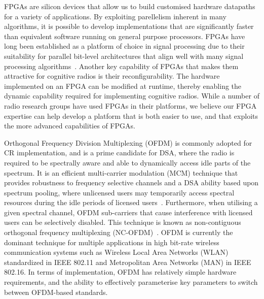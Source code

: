 FPGAs are silicon devices that allow us to build customised hardware datapaths for a variety of applications.
By exploiting parellelism inherent in many algorithms, it is possible to develop implementations that are significantly faster than equivalent software running on general purpose processors.
FPGAs have long been established as a platform of choice in signal processing due to their suitability for parallel bit-level architectures that align well with many signal processing algorithms~\cite{cummings1999}.
Another key capability of FPGAs that makes them attractive for cognitive radios is their reconfigurability.
The hardware implemented on an FPGA can be modified at runtime, thereby enabling the dynamic capability required for implementing cognitive radios.
While a number of radio research groups have used FPGAs in their platforms, we believe our FPGA expertise can help develop a platform that is both easier to use, and that exploits the more advanced capabilities of FPGAs.


Orthogonal Frequency Division Multiplexing (OFDM) is commonly adopted for CR implementation, and is a prime candidate for DSA, where the radio is required to be spectrally aware and able to dynamically access idle parts of the spectrum.
It is an efficient multi-carrier modulation (MCM) technique that provides robustness to frequency selective channels and a DSA ability based upon spectrum pooling, where unlicensed users may temporarily access spectral resources during the idle periods of licensed users~\cite{JondralMarch2004}.
Furthermore, when utilising a given spectral channel, OFDM sub-carriers that cause interference with licensed users can be selectively disabled.
 This technique is known as non-contiguous orthogonal frequency multiplexing (NC-OFDM)~\cite{MindenJune2006}.
OFDM is currently the dominant technique for multiple applications in high bit-rate wireless communication systems such as Wireless Local Area Networks (WLAN) standardized in IEEE 802.11 and Metropolitan Area Networks (MAN) in IEEE 802.16.
In terms of implementation, OFDM has relatively simple hardware requirements, and the ability to effectively parameterise key parameters to switch between OFDM-based standards.


